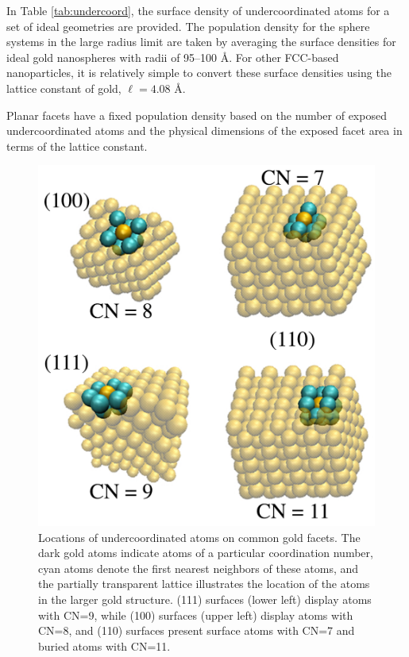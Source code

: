 In Table \ref{tab:undercoord}, the surface density of
undercoordinated atoms for a set of ideal geometries are provided.
The population
density for the sphere systems in the large radius limit are taken by
averaging the surface densities for ideal gold nanospheres with radii
of 95--100 \AA.  For other FCC-based nanoparticles, it is relatively
simple to convert these surface densities using the lattice constant
of gold, $\ell = 4.08 \text{~\AA}$.

Planar facets have a fixed population density based on the number of
exposed undercoordinated atoms and the physical dimensions of the
exposed facet area in terms of the lattice constant.
\begin{figure}[!htb]
        \includegraphics[width=5in]{figures/facets-cn.pdf}
        \caption{Locations of undercoordinated atoms on common gold
          facets. The dark gold atoms indicate atoms of a particular
          coordination number, cyan atoms denote the first nearest
          neighbors of these atoms, and the partially transparent
          lattice illustrates the location of the atoms in the larger
          gold structure. (111) surfaces (lower left) display atoms
          with CN=9, while (100) surfaces (upper left) display atoms
          with CN=8, and (110) surfaces present surface atoms with
          CN=7 and buried atoms with CN=11. }
        \label{fig:facets-cn}
\end{figure}
